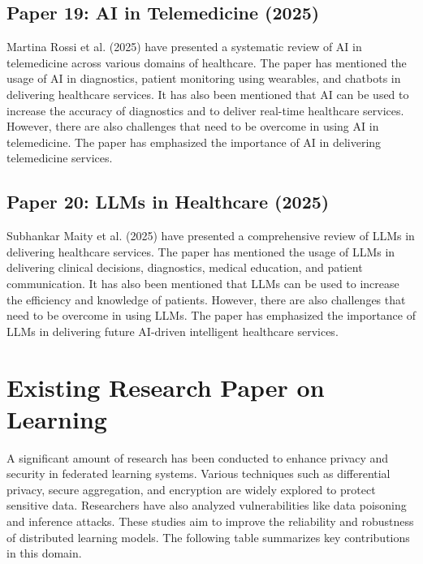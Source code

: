 \subsection{Paper 19: AI in Telemedicine (2025)}
Martina Rossi et al. (2025) have presented a systematic review of AI in telemedicine across various domains of healthcare. The paper has mentioned the usage of AI in diagnostics, patient monitoring using wearables, and chatbots in delivering healthcare services. It has also been mentioned that AI can be used to increase the accuracy of diagnostics and to deliver real-time healthcare services. However, there are also challenges that need to be overcome in using AI in telemedicine. The paper has emphasized the importance of AI in delivering telemedicine services. \cite{rossi2025}

\subsection{Paper 20: LLMs in Healthcare (2025)}
Subhankar Maity et al. (2025) have presented a comprehensive review of LLMs in delivering healthcare services. The paper has mentioned the usage of LLMs in delivering clinical decisions, diagnostics, medical education, and patient communication. It has also been mentioned that LLMs can be used to increase the efficiency and knowledge of patients. However, there are also challenges that need to be overcome in using LLMs. The paper has emphasized the importance of LLMs in delivering future AI-driven intelligent healthcare services. \cite{maity2025,wang2024}


\section{Existing Research Paper on Learning}

A significant amount of research has been conducted to enhance privacy and security in federated learning systems. Various techniques such as differential privacy, secure aggregation, and encryption are widely explored to protect sensitive data. Researchers have also analyzed vulnerabilities like data poisoning and inference attacks. These studies aim to improve the reliability and robustness of distributed learning models. The following table summarizes key contributions in this domain.

